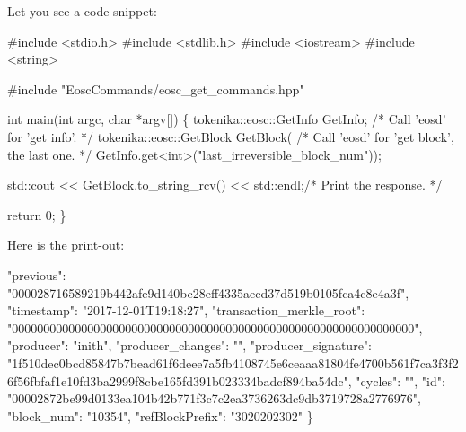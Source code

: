 Let you see a code snippet\+: 
\begin{DoxyCode}
#include <stdio.h>
#include <stdlib.h>
#include <iostream>
#include <string>

#include "EoscCommands/eosc\_get\_commands.hpp"

int main(int argc, char *argv[])
\{
  tokenika::eosc::GetInfo GetInfo; /* Call 'eosd' for 'get info'. */
  tokenika::eosc::GetBlock GetBlock( /* Call 'eosd' for 'get block', the last one. */
    GetInfo.get<int>("last\_irreversible\_block\_num"));

  std::cout << GetBlock.to\_string\_rcv() << std::endl;/* Print the response. */

  return 0;
\}
\end{DoxyCode}
 Here is the print-\/out\+: 
\begin{DoxyCode}
    "previous": "000028716589219b442afe9d140bc28eff4335aecd37d519b0105fca4c8e4a3f",
    "timestamp": "2017-12-01T19:18:27",
    "transaction\_merkle\_root": "0000000000000000000000000000000000000000000000000000000000000000",
    "producer": "inith",
    "producer\_changes": "",
    "producer\_signature":
       "1f510dec0bcd85847b7bead61f6deee7a5fb4108745e6ceaaa81804fe4700b561f7ca3f3f26f56fbfaf1e10fd3ba2999f8cbe165fd391b023334badcf894ba54dc",
    "cycles": "",
    "id": "00002872be99d0133ea104b42b771f3c7c2ea3736263dc9db3719728a2776976",
    "block\_num": "10354",
    "refBlockPrefix": "3020202302"
\}
\end{DoxyCode}
 